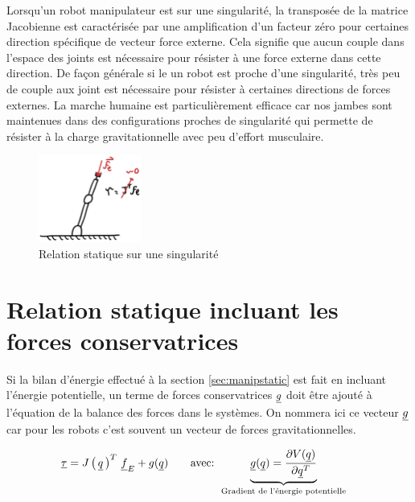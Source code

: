 Lorsqu'un robot manipulateur est sur une singularité, la transposée de la matrice Jacobienne est caractérisée par une amplification d'un facteur zéro pour certaines direction spécifique de vecteur force externe. Cela signifie que aucun couple dans l'espace des joints est nécessaire pour résister à une force externe dans cette direction. De façon générale si le un robot est proche d'une singularité, très peu de couple aux joint est nécessaire pour résister à certaines directions de forces externes. La marche humaine est particulièrement efficace car nos jambes sont maintenues dans des configurations proches de singularité qui permette de résister à la charge gravitationnelle avec peu d'effort musculaire. 
\begin{figure}[H]
	\centering
		\includegraphics[width=0.30\textwidth]{fig/externalforcesingularity.jpg}
	\caption{Relation statique sur une singularité}
	\label{fig:externalforcesingularity}
\end{figure}


\section{Relation statique incluant les forces conservatrices}
\label{sec:manipstaticconservative}

Si la bilan d'énergie effectué à la section \ref{sec:manipstatic} est fait en incluant l'énergie potentielle, un terme de forces conservatrices $\underline{g}$ doit être ajouté à l'équation de la balance des forces dans le systèmes. On nommera ici ce vecteur $\underline{g}$ car pour les robots c'est souvent un vecteur de forces gravitationnelles. 

\begin{align}
\underline{\tau} &= J\left( \, \underline{q} \, \right)^T \, \underline{f}_E +  g( \underline{q} )
\quad \quad \text{avec:  }
\underbrace{ \underline{g} ( \underline{q} ) = 
\frac{ \partial V(\underline{q} ) }{\partial \underline{q}^T } 
}_{\text{Gradient de l'énergie potentielle}}
\label{eq:staticgravity}
\end{align}


